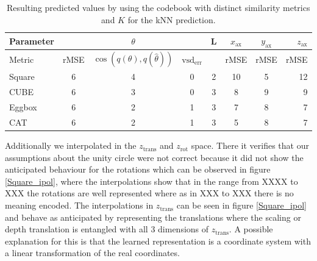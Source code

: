 \documentclass[10pt,a4paper]{article}
\newcommand{\rot}{\ensuremath{\text{rot}\xspace}}
\newcommand{\trans}{\ensuremath{\text{trans}\xspace}}
\begin{document}
\begin{table}
\begin{tabular}[width = \textwidth]{l*{6}{c}r} 
Parameter              &  & $\theta$ &  & L & $x_{\text{ax}}$  & $y_{\text{ax}}$ & $z_{\text{ax}}$ \\
\hline
Metric &  rMSE& $\cos(q(\theta), q(\hat{\theta}))$ & $\text{vsd}_{\text{err}}$ &  & rMSE  & rMSE & rMSE \\
\hline
Square & 6 & 4 & 0 & 2 & 10 & 5 & 12  \\
CUBE            & 6 & 3 & 0 & 3 &  8 & 9 &  9  \\
Eggbox           & 6 & 2 & 1 & 3 &  7 & 8 &  7  \\
CAT     & 6 & 2 & 1 & 3 &  5 & 8 &  7  \\
\end{tabular}
\caption{Resulting predicted values by using the codebook with distinct similarity metrics and $K$ for the kNN prediction.}
\label{square_results}
\end{table}
Additionally we interpolated in the $z_{\trans}$ and $z_{\rot}$ space. There it verifies that our assumptions about the unity circle were not correct because it did not show the anticipated behaviour for the rotations which can be observed in figure \ref{Square_ipol}, where the interpolations show that in the range from XXXX to XXX the rotations are well represented where as in XXX to XXX there is no meaning encoded.
The interpolations in $z_{\trans}$ can be seen in figure \ref{Square_ipol} and behave as anticipated by representing the translations where the scaling or depth translation is entangled with all 3 dimensions of $z_{\trans}$. A possible explanation for this is that the learned representation is a coordinate system with a linear transformation of the real coordinates.\\  
\end{document}
